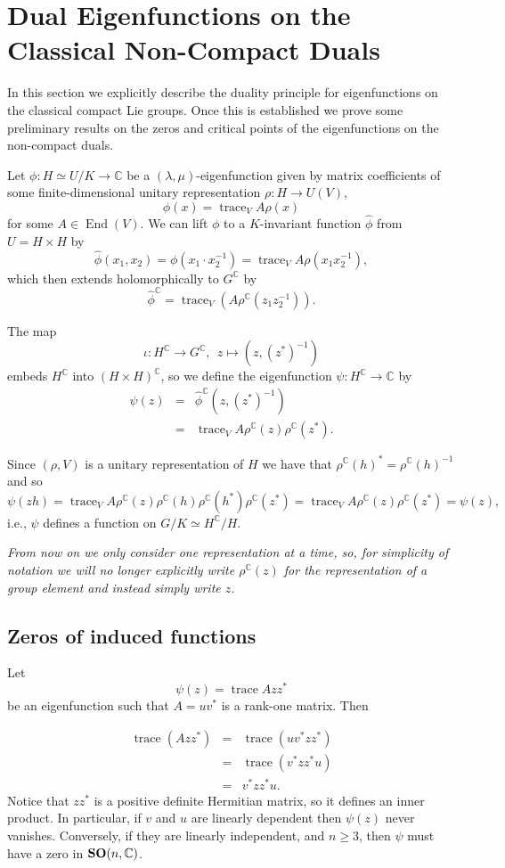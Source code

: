 \documentclass[11pt,reqno]{amsart}
\theoremstyle{plain}
\theoremstyle{definition}
\numberwithin{equation}{section}
\def \cn{{\mathbb C}}
\DeclareMathOperator{\End}{End}
\def \SOC#1{\text{\bf SO}(#1,\cn)}
\DeclareMathOperator{\trace}{trace}
\numberwithin{equation}{section}
\begin{document}
\section{Dual Eigenfunctions on the Classical Non-Compact Duals}
In this section we explicitly describe the duality principle for eigenfunctions on the classical compact Lie groups. Once this is established we prove some preliminary results on the zeros and critical points of the eigenfunctions on the non-compact duals.

Let $\phi: H \simeq U/K \to \cn$ be a $(\lambda,\mu)$-eigenfunction given by matrix coefficients of some finite-dimensional unitary representation $\rho: H \to U(V)$,
$$ \phi(x) = \trace_V A\rho(x)$$
for some $A \in \End (V)$. 
 We can lift $\phi$ to a $K$-invariant function $\hat \phi$ from $U =H \times H$ by $$\hat{\phi} (x_1 ,x_2) = \phi(x_1 \cdot x_2^{-1}) = \trace_V A \rho(x_1 x_2^{-1}),$$ which then extends holomorphically to $G^\cn$ by
 $$ \hat \phi^\cn = \trace_V(A \rho^\cn(z_1 z_2^{-1})).$$
 
The map 
$$ \iota : H^\cn \to G^\cn, \ \ z \mapsto (z,(z^*)^{-1})$$
 embeds $H^\cn$ into $(H \times H)^\cn$, so we define the eigenfunction $\psi: H^\cn  \to \cn$ by
\begin{eqnarray*}
\psi(z) &=& \hat \phi^\cn(z,(z^*)^{-1}) \\&=& \trace_V A  \rho^\cn(z) \rho^\cn(z^*).
\end{eqnarray*}

Since $(\rho,V)$ is a unitary representation of $H$ we have that $\rho^\cn(h)^* =\rho^\cn(h)^{-1} $ and so
$$\psi(zh) = \trace_V A  \rho^\cn(z) \rho^\cn(h) \rho^\cn(h^*) \rho^\cn(z^*) = \trace_V A  \rho^\cn(z) \rho^\cn(z^*) = \psi(z),$$
i.e., $\psi$ defines a function on $G/K \simeq H^\cn/H$.


{\it From now on we only consider one representation at a time, so, for simplicity of notation we will no longer explicitly write $\rho^\cn(z)$ for the representation of a group element and instead simply write $z$.}


\subsection{Zeros of induced functions} \label{subsection-zeros}
Let
$$ \psi(z) = \trace A z z^* $$
be an eigenfunction such that $A = u v^*$ is a rank-one matrix. Then

\begin{eqnarray*}
\trace(Azz^*) &=& \trace (u v^* z z^*) \\
&=& \trace ( v^* z z^* u) \\
&=& v^* z z^* u.
\end{eqnarray*}
Notice that $z z^*$ is a positive definite Hermitian matrix, so it defines an inner product. In particular, if $v$ and $u$ are linearly dependent then $\psi(z)$ never vanishes. Conversely, if they are linearly independent, and $n \geq 3$, then $\psi$ must have a zero in $\SOC{n}$. 
\end{document}

